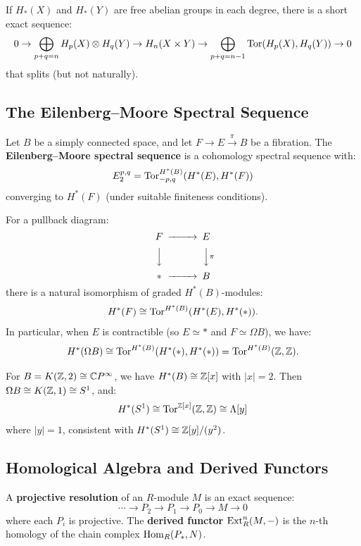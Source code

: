 \begin{corollary}
If $H_*(X)$ and $H_*(Y)$ are free abelian groups in each degree, there is a short exact sequence:
\[
0 \to \bigoplus_{p+q=n} H_p(X) \otimes H_q(Y) \to H_n(X \times Y) \to \bigoplus_{p+q=n-1} \operatorname{Tor}(H_p(X), H_q(Y)) \to 0
\]
that splits (but not naturally).
\end{corollary}

\subsection{The Eilenberg--Moore Spectral Sequence}

Let $B$ be a simply connected space, and let $F \to E \xrightarrow{\pi} B$ be a fibration. The \textbf{Eilenberg--Moore spectral sequence} is a cohomology spectral sequence with:
\[
E_2^{p,q} = \operatorname{Tor}^{H^*(B)}_{-p,q}(H^*(E), H^*(F))
\]
converging to $H^*(F)$ (under suitable finiteness conditions).

\begin{theorem}
For a pullback diagram:
\[
\begin{CD}
F @>>> E \\
@VVV @VV{\pi}V \\
* @>>> B
\end{CD}
\]
there is a natural isomorphism of graded $H^*(B)$-modules:
\[
H^*(F) \cong \operatorname{Tor}^{H^*(B)}(H^*(E), H^*(*)).
\]
In particular, when $E$ is contractible (so $E \simeq *$ and $F \simeq \Omega B$), we have:
\[
H^*(\Omega B) \cong \operatorname{Tor}^{H^*(B)}(H^*(*), H^*(*)) = \operatorname{Tor}^{H^*(B)}(\mathbb{Z},\mathbb{Z}).
\]
\end{theorem}

\begin{example}
For $B = K(\mathbb{Z},2) \cong \mathbb{C}P^\infty$, we have $H^*(B) \cong \mathbb{Z}[x]$ with $|x| = 2$. Then $\Omega B \cong K(\mathbb{Z},1) \cong S^1$, and:
\[
H^*(S^1) \cong \operatorname{Tor}^{\mathbb{Z}[x]}(\mathbb{Z},\mathbb{Z}) \cong \Lambda[y]
\]
where $|y| = 1$, consistent with $H^*(S^1) \cong \mathbb{Z}[y]/(y^2)$.
\end{example}

\subsection{Homological Algebra and Derived Functors}

\begin{definition}
A \textbf{projective resolution} of an $R$-module $M$ is an exact sequence:
\[
\cdots \to P_2 \to P_1 \to P_0 \to M \to 0
\]
where each $P_i$ is projective. The \textbf{derived functor} $\operatorname{Ext}_R^n(M,-)$ is the $n$-th homology of the chain complex $\operatorname{Hom}_R(P_*, N)$.
\end{definition}

